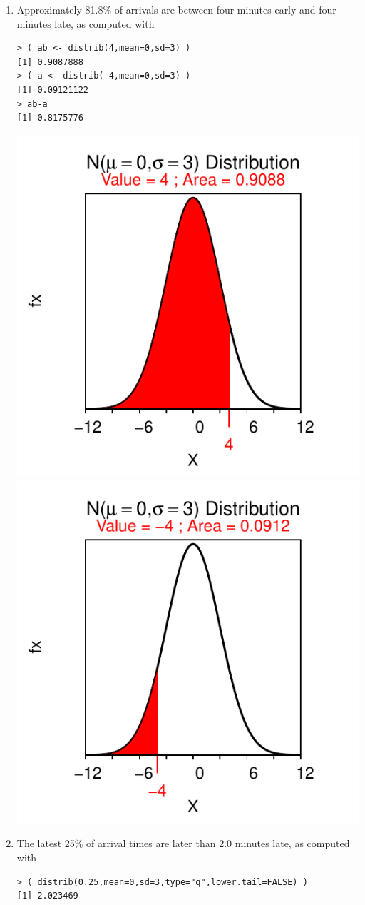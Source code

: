 \documentclass[10pt,openany]{book}\usepackage[]{graphicx}\usepackage[]{color}
\makeatletter
\newenvironment{kframe}{%
 \def\at@end@of@kframe{}%
 \ifinner\ifhmode%
  \def\at@end@of@kframe{\end{minipage}}%
  \begin{minipage}{\columnwidth}%
 \fi\fi%
 \def\FrameCommand##1{\hskip\@totalleftmargin \hskip-\fboxsep
 \colorbox{shadecolor}{##1}\hskip-\fboxsep
     \hskip-\linewidth \hskip-\@totalleftmargin \hskip\columnwidth}%
 \MakeFramed {\advance\hsize-\width
   \@totalleftmargin\z@ \linewidth\hsize
   \@setminipage}}%
 {\par\unskip\endMakeFramed%
 \at@end@of@kframe}
\newenvironment{knitrout}{}{} %
\makeatother
\begin{document}
\begin{itemize}
\begin{enumerate}
\begin{knitrout}
{}



\end{knitrout}
      \item Approximately 81.8\% of arrivals are between four minutes early and four minutes late, as computed with
\begin{knitrout}
\color{fgcolor}\begin{kframe}
\begin{verbatim}
> ( ab <- distrib(4,mean=0,sd=3) )
[1] 0.9087888
> ( a <- distrib(-4,mean=0,sd=3) )
[1] 0.09121122
> ab-a
[1] 0.8175776
\end{verbatim}
\end{kframe}

{\centering \includegraphics[width=.4\linewidth]{Figs/unnamed-chunk-234-1} 
\includegraphics[width=.4\linewidth]{Figs/unnamed-chunk-234-2} 

}



\end{knitrout}
      \item The latest 25\% of arrival times are later than 2.0 minutes late, as computed with
\begin{knitrout}
\color{fgcolor}\begin{kframe}
\begin{verbatim}
> ( distrib(0.25,mean=0,sd=3,type="q",lower.tail=FALSE) )
[1] 2.023469
\end{verbatim}
\end{kframe}


\end{knitrout}
\end{enumerate}
\end{itemize}
\end{document}
